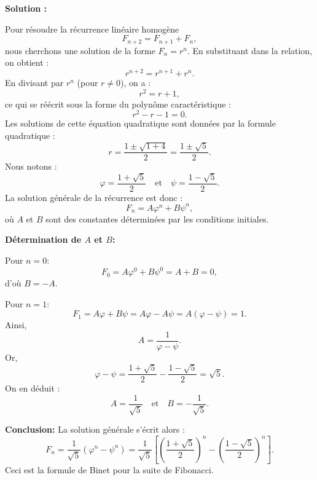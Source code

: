 \documentclass[11pt,twoside,openany]{book}
\newenvironment{solution}{\par\textbf{Solution :}\par\small}{\normalsize\par}
\begin{document}
\begin{solution}
Pour résoudre la récurrence linéaire homogène
\[
F_{n+2}=F_{n+1}+F_n,
\]
nous cherchons une solution de la forme \(F_n=r^n\). En substituant dans la relation, on obtient :
\[
r^{n+2}=r^{n+1}+r^n.
\]
En divisant par \(r^n\) (pour \(r\neq 0\)), on a :
\[
r^2 = r + 1,
\]
ce qui se réécrit sous la forme du polynôme caractéristique :
\[
r^2 - r - 1 = 0.
\]
Les solutions de cette équation quadratique sont données par la formule quadratique :
\[
r=\frac{1\pm\sqrt{1+4}}{2}=\frac{1\pm\sqrt{5}}{2}.
\]
Nous notons :
\[
\varphi = \frac{1+\sqrt{5}}{2} \quad \text{et} \quad \psi = \frac{1-\sqrt{5}}{2}.
\]
La solution générale de la récurrence est donc :
\[
F_n = A\varphi^n + B\psi^n,
\]
où \(A\) et \(B\) sont des constantes déterminées par les conditions initiales.

\medskip

\textbf{Détermination de \(A\) et \(B\):} %

Pour \(n=0\):
\[
F_0 = A\varphi^0 + B\psi^0 = A + B = 0,
\]
d'où \(B = -A\).

Pour \(n=1\):
\[
F_1 = A\varphi + B\psi = A\varphi - A\psi = A(\varphi - \psi) = 1.
\]
Ainsi,
\[
A = \frac{1}{\varphi - \psi}.
\]
Or,
\[
\varphi - \psi = \frac{1+\sqrt{5}}{2} - \frac{1-\sqrt{5}}{2} = \sqrt{5}.
\]
On en déduit :
\[
A=\frac{1}{\sqrt{5}} \quad \text{et} \quad B=-\frac{1}{\sqrt{5}}.
\]

\medskip

\textbf{Conclusion:}  
La solution générale s'écrit alors :
\[
F_n = \frac{1}{\sqrt{5}}(\varphi^n - \psi^n) = \frac{1}{\sqrt{5}}\left[\left(\frac{1+\sqrt{5}}{2}\right)^n - \left(\frac{1-\sqrt{5}}{2}\right)^n\right].
\]
Ceci est la formule de Binet pour la suite de Fibonacci.
\end{solution}

\backmatter
\end{document}
